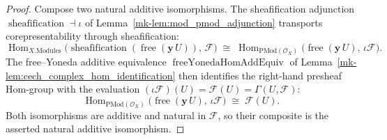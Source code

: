 \begin{proof}
  Compose two natural additive isomorphisms. The sheafification adjunction
  \(\operatorname{sheafification} \dashv \iota\) of
  Lemma~\ref{mk-lem:mod_pmod_adjunction} transports corepresentability through
  sheafification:
  \[
    \operatorname{Hom}_{X.\mathrm{Modules}}\bigl(
      \operatorname{sheafification}(\operatorname{free}(\mathbf{y}\,U)),\, \mathcal{F}
    \bigr)
    \;\cong\;
    \operatorname{Hom}_{\mathrm{PMod}(\mathcal{O}_X)}\bigl(
      \operatorname{free}(\mathbf{y}\,U),\, \iota\mathcal{F}\bigr).
  \]
  The free–Yoneda additive equivalence \(\operatorname{freeYonedaHomAddEquiv}\) of
  Lemma~\ref{mk-lem:cech_complex_hom_identification} then identifies the right-hand
  presheaf Hom-group with the evaluation \((\iota\mathcal{F})(U) = \mathcal{F}(U) =
  \Gamma(U, \mathcal{F})\):
  \[
    \operatorname{Hom}_{\mathrm{PMod}(\mathcal{O}_X)}\bigl(
      \operatorname{free}(\mathbf{y}\,U),\, \iota\mathcal{F}\bigr)
    \;\cong\;
    \mathcal{F}(U).
  \]
  Both isomorphisms are additive and natural in \(\mathcal{F}\), so their composite is
  the asserted natural additive isomorphism.
\end{proof}

